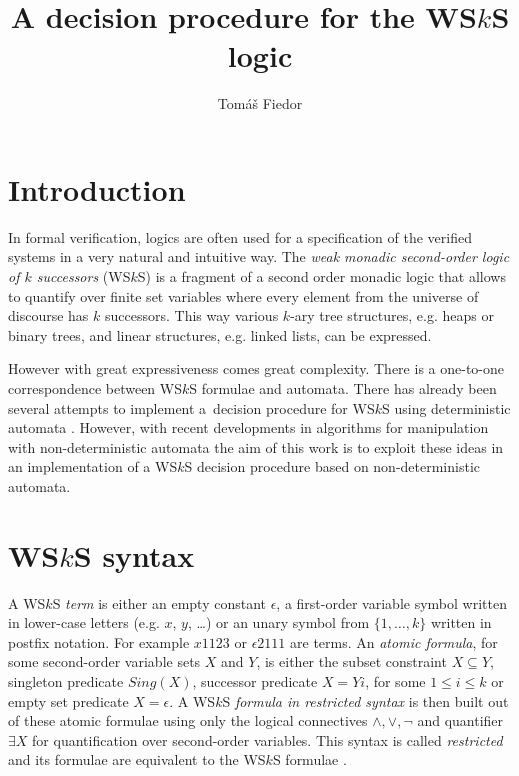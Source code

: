 \documentclass{eeict}
\title{A decision procedure for the WS$k$S logic}
\author{Tomáš Fiedor}
\begin{document}
\maketitle

\section{Introduction}

In formal verification, logics are often used for a specification of the
verified systems in a very natural and intuitive way. The \emph{weak monadic
second-order logic of $k$ successors} (WS$k$S) \cite{wsks} is a fragment of a
second order monadic logic that allows to quantify over finite set variables
where every element from the universe of discourse has $k$ successors. This way
various $k$-ary tree structures, e.g.
heaps or binary trees, and linear structures, e.g. linked lists, can be expressed.

However with great expressiveness comes great complexity. There is a
one-to-one correspondence between WS$k$S formulae and automata. There has
already been several attempts to implement a~decision procedure for WS$k$S using
deterministic automata \cite{mona}. However, with recent developments in
algorithms for manipulation with non-deterministic automata the aim of this work
is to exploit these ideas in an implementation of a WS$k$S decision procedure
based on non-deterministic automata.

\section{WS$k$S syntax}

A WS$k$S \emph{term} is either an empty constant $\epsilon$, a first-order
variable symbol written in lower-case letters (e.g. $x$, $y$, \ldots) or an
unary symbol from $\{1,\ldots,k\}$ written in postfix notation. For example
$x1123$ or $\epsilon2111$ are terms. An \emph{atomic formula}, for some
second-order variable sets $X$ and $Y$, is either the subset constraint $X
\subseteq Y$, singleton predicate $Sing(X)$, successor predicate $X = Yi$, for some $1 \leq i
\leq k$ or empty set predicate $X = \epsilon$. A WS$k$S \emph{formula in
restricted syntax} is then built out of these atomic formulae using only the
logical connectives $\wedge, \vee, \neg$ and quantifier $\exists X$ for
quantification over second-order variables. This syntax is called
\emph{restricted} and its formulae are equivalent to the WS$k$S formulae
\cite{tata}.
\end{document}
